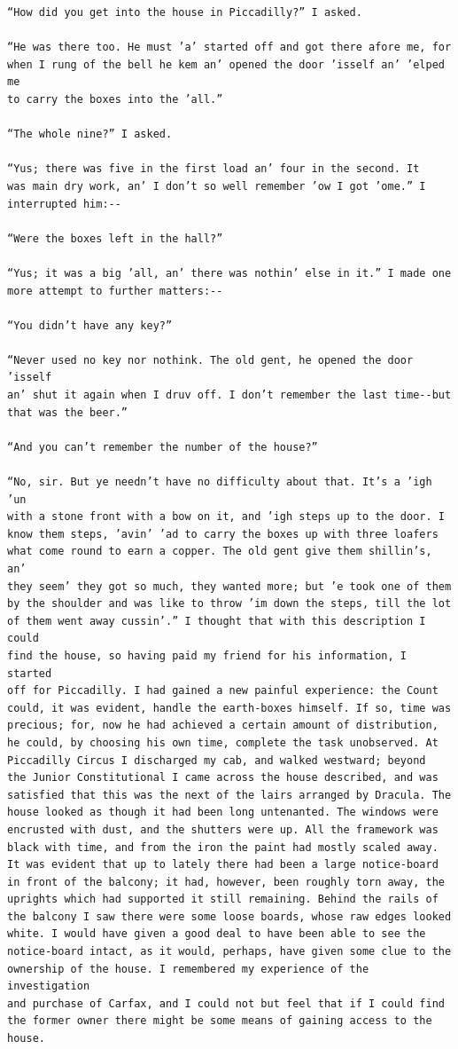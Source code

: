 \documentclass{article}
\begin{document}
\begin{verbatim}
“How did you get into the house in Piccadilly?” I asked.

“He was there too. He must ’a’ started off and got there afore me, for
when I rung of the bell he kem an’ opened the door ’isself an’ ’elped me
to carry the boxes into the ’all.”

“The whole nine?” I asked.

“Yus; there was five in the first load an’ four in the second. It
was main dry work, an’ I don’t so well remember ’ow I got ’ome.” I
interrupted him:--

“Were the boxes left in the hall?”

“Yus; it was a big ’all, an’ there was nothin’ else in it.” I made one
more attempt to further matters:--

“You didn’t have any key?”

“Never used no key nor nothink. The old gent, he opened the door ’isself
an’ shut it again when I druv off. I don’t remember the last time--but
that was the beer.”

“And you can’t remember the number of the house?”

“No, sir. But ye needn’t have no difficulty about that. It’s a ’igh ’un
with a stone front with a bow on it, and ’igh steps up to the door. I
know them steps, ’avin’ ’ad to carry the boxes up with three loafers
what come round to earn a copper. The old gent give them shillin’s, an’
they seem’ they got so much, they wanted more; but ’e took one of them
by the shoulder and was like to throw ’im down the steps, till the lot
of them went away cussin’.” I thought that with this description I could
find the house, so having paid my friend for his information, I started
off for Piccadilly. I had gained a new painful experience: the Count
could, it was evident, handle the earth-boxes himself. If so, time was
precious; for, now he had achieved a certain amount of distribution,
he could, by choosing his own time, complete the task unobserved. At
Piccadilly Circus I discharged my cab, and walked westward; beyond
the Junior Constitutional I came across the house described, and was
satisfied that this was the next of the lairs arranged by Dracula. The
house looked as though it had been long untenanted. The windows were
encrusted with dust, and the shutters were up. All the framework was
black with time, and from the iron the paint had mostly scaled away.
It was evident that up to lately there had been a large notice-board
in front of the balcony; it had, however, been roughly torn away, the
uprights which had supported it still remaining. Behind the rails of
the balcony I saw there were some loose boards, whose raw edges looked
white. I would have given a good deal to have been able to see the
notice-board intact, as it would, perhaps, have given some clue to the
ownership of the house. I remembered my experience of the investigation
and purchase of Carfax, and I could not but feel that if I could find
the former owner there might be some means of gaining access to the
house.


\end{verbatim}
\end{document}
